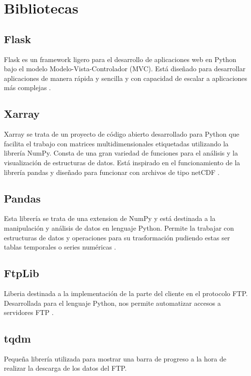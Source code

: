 \section{Bibliotecas}\label{librerias}
	\subsection{Flask}\label{Flask}
Flask es un framework ligero para el desarrollo de aplicaciones web en Python bajo el modelo Modelo-Vista-Controlador (MVC). Está diseñado para desarrollar aplicaciones de manera rápida y sencilla y con capacidad de escalar a aplicaciones más complejas \cite{flask}.

	\subsection{Xarray}\label{xarray}
Xarray se trata de un proyecto de código abierto desarrollado para Python que facilita el trabajo con matrices multidimensionales etiquetadas utilizando la librería NumPy. Consta de una gran variedad de funciones para el análisis y la visualización de estructuras de datos. Está inspirado en el funcionamiento de la librería pandas y diseñado para funcionar con archivos de tipo netCDF \cite{xarray}.
	
	\subsection{Pandas}\label{pandas}
Esta librería se trata de una extension de NumPy y está destinada a la manipulación y análisis de datos en lenguaje Python. Permite la trabajar con estructuras de datos y operaciones para su trasformación pudiendo estas ser tablas temporales o series numéricas \cite{pandas}.

	\subsection{FtpLib}\label{FtpLib}
Liberia destinada a la implementación de la parte del cliente en el protocolo FTP. Desarrollada para el lenguaje Python, nos permite automatizar accesos a servidores FTP \cite{ftp_lib}.

	\subsection{tqdm}\label{tqdm}
Pequeña librería utilizada para mostrar una barra de progreso a la hora de realizar la descarga de los datos del FTP.
